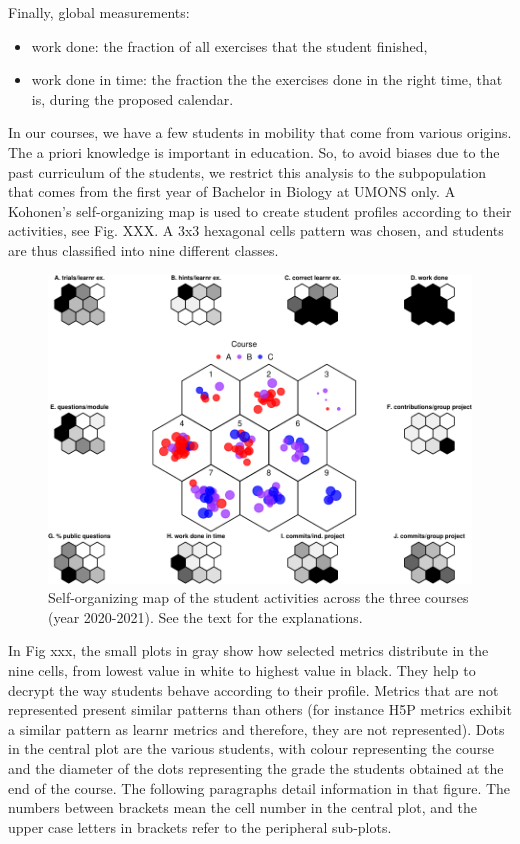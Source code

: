 \documentclass[
]{article}
\providecommand{\tightlist}{%
  \setlength{\itemsep}{0pt}\setlength{\parskip}{0pt}}
\begin{document}
Finally, global measurements:

\begin{itemize}
\tightlist
\item
  work done: the fraction of all exercises that the student finished,
\item
  work done in time: the fraction the the exercises done in the right
  time, that is, during the proposed calendar.
\end{itemize}

In our courses, we have a few students in mobility that come from
various origins. The a priori knowledge is important in education. So,
to avoid biases due to the past curriculum of the students, we restrict
this analysis to the subpopulation that comes from the first year of
Bachelor in Biology at UMONS only. A Kohonen's self-organizing map is
used to create student profiles according to their activities, see Fig.
XXX. A 3x3 hexagonal cells pattern was chosen, and students are thus
classified into nine different classes.

\begin{figure}
\centering
\includegraphics{teaching_data_science_files/figure-latex/fig_som-1.pdf}
\caption{Self-organizing map of the student activities across the three
courses (year 2020-2021). See the text for the explanations.}
\end{figure}

In Fig xxx, the small plots in gray show how selected metrics distribute
in the nine cells, from lowest value in white to highest value in black.
They help to decrypt the way students behave according to their profile.
Metrics that are not represented present similar patterns than others
(for instance H5P metrics exhibit a similar pattern as learnr metrics
and therefore, they are not represented). Dots in the central plot are
the various students, with colour representing the course and the
diameter of the dots representing the grade the students obtained at the
end of the course. The following paragraphs detail information in that
figure. The numbers between brackets mean the cell number in the central
plot, and the upper case letters in brackets refer to the peripheral
sub-plots.
\end{document}
